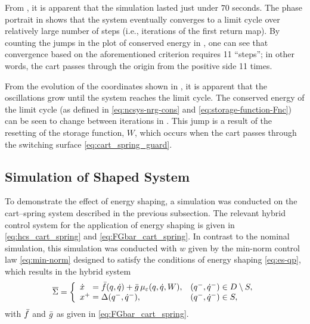 From , it is apparent that the
simulation lasted just under $70$ seconds.
% 
The phase portrait in  shows that the
system eventually converges to a limit cycle over relatively large number of
steps (i.e., iterations of the \Poincare{} first return map).
By counting the jumps in the plot of conserved energy in
, one can see that convergence based
on the aforementioned criterion requires 11 ``steps'';
% 
in other words, the cart passes through the origin from the positive side 11
times.


From the evolution of the coordinates shown in
, it is apparent that the
oscillations grow until the system reaches the limit cycle.
% 
The conserved energy of the limit cycle (as defined in
\eqref{eq:ncsys-nrg-cons} and \eqref{eq:storage-function-Fnc}) can be seen to change between iterations in .
% 
This jump is a result of the resetting of the storage function, $W$, which
occurs when the cart passes through the switching surface
\eqref{eq:cart_spring_guard}.

\subsection{Simulation of Shaped System}

To demonstrate the effect of energy shaping, a simulation was conducted on the
cart--spring system described in the previous subsection.
% 
The relevant hybrid control system for the application of energy shaping is
given in \eqref{eq:hcs_cart_spring} and \eqref{eq:FGbar_cart_spring}.
% 
In contrast to the nominal simulation, this simulation was conducted with $w$
given by the min-norm control law \eqref{eq:min-norm} designed to satisfy the
conditions of energy shaping \eqref{eq:es-qp}, which results in the
hybrid system
\begin{align}
  \label{eq:hs_cart_spring_es}
  {\overline {\Sigma}} = \left\{
    \begin{array}{l l}
      {\dot {x}}\hphantom{^+} = {\bar {f}}(q, \dot{q}) + {\bar {g}} \, \mu_{\varepsilon}(q, \dot{q}, W), & (q^{-}, \dot{q}^{-}) \in D \setminus S,\\
      x^{+} = \Delta(q^{-}, \dot{q}^{-}), & (q^{-}, \dot{q}^{-}) \in S,
    \end{array}\right.
\end{align}
with ${\bar {f}}$ and ${\bar {g}}$ as given in \eqref{eq:FGbar_cart_spring}.

